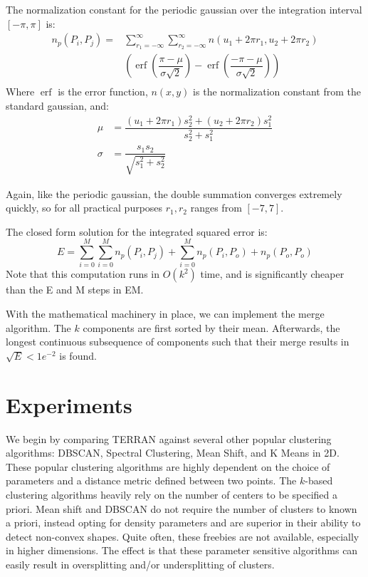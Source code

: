 \documentclass{acm_proc_article-sp}
\DeclareMathOperator\erf{erf}
\begin{document}
The normalization constant for the periodic gaussian over the integration interval $[-\pi, \pi]$ is:
\begin{align*}
n_p(P_i,P_j) = & \sum \limits^{\infty}_{r_1=-\infty} \sum \limits^{\infty}_{r_2=-\infty} n(u_1+2 \pi r_1, u_2+2 \pi r_2) \\
                        & \left(\erf\left( \dfrac{\pi-\mu}{\sigma\sqrt{2}}\right) - \erf\left( \dfrac{-\pi-\mu}{\sigma\sqrt{2}}\right)\right) \\
\end{align*}
Where $\erf$ is the error function, $n(x,y)$ is the normalization constant from the standard gaussian, and:
\begin{align*}
\mu &= \dfrac{ (u_1+2 \pi r_1)s_2^2 +  (u_2+2 \pi r_2)s_1^2} {s_2^2 + s_1^2} \\
\sigma &= \dfrac{s_1 s_2}{\sqrt{s_1^2+s_2^2}}
\end{align*}
 
Again, like the periodic gaussian, the double summation converges extremely quickly, so for all practical purposes $r_1, r_2$ ranges from $[-7,7]$.

The closed form solution for the integrated squared error is:
\begin{equation}
E = \sum \limits^{M}_{i=0} \sum \limits^{M}_{i=0} n_p(P_i, P_j) + \sum \limits^{M}_{i=0} n_p(P_i, P_o) + n_p(P_o, P_o)
\end{equation}
Note that this computation runs in $O(k^2)$ time, and is significantly cheaper than the E and M steps in EM. 

With the mathematical machinery in place, we can implement the merge algorithm. The $k$ components are first sorted by their mean. Afterwards, the longest continuous subsequence of components such that their merge results in $\sqrt{E} < 1e^{-2}$ is found.
\section{Experiments}

We begin by comparing TERRAN against several other popular clustering algorithms: DBSCAN, Spectral Clustering, Mean Shift, and K Means in 2D. These popular clustering algorithms are highly dependent on the choice of parameters and a distance metric defined between two points. The $k$-based clustering algorithms heavily rely on the number of centers to be specified a priori. Mean shift and DBSCAN do not require the number of clusters to known a priori, instead opting for density parameters and are superior in their ability to detect non-convex shapes. Quite often, these freebies are not available, especially in higher dimensions. The effect is that these parameter sensitive algorithms can easily result in oversplitting and/or undersplitting of clusters. 
\end{document}
